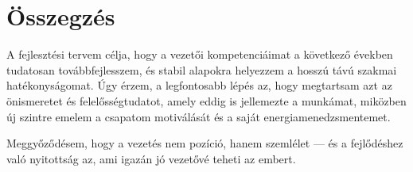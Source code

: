 \section{Összegzés}

A fejlesztési tervem célja, hogy a vezetői kompetenciáimat a következő években tudatosan továbbfejlesszem, és stabil alapokra helyezzem a hosszú távú szakmai hatékonyságomat.
Úgy érzem, a legfontosabb lépés az, hogy megtartsam azt az önismeretet és felelősségtudatot, amely eddig is jellemezte a munkámat, miközben új szintre emelem a csapatom motiválását és a saját energiamenedzsmentemet.

Meggyőződésem, hogy a vezetés nem pozíció, hanem szemlélet — és a fejlődéshez való nyitottság az, ami igazán jó vezetővé teheti az embert.
